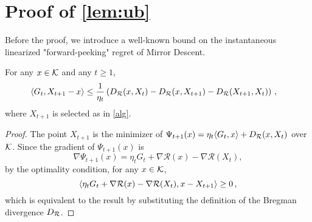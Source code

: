 \fi

\section{Proof of \cref{lem:ub}}
\label{sec:lemub-proof}
\label{sec:ublemma-proof}
Before the proof, we introduce a well-known bound on the instantaneous linearized "forward-peeking" regret of Mirror Descent.
\begin{lemma}
\label{lem:mdlinregret}
For any $x \in \mathcal{K}$ and any $t \ge 1$,
\begin{align*}
\MoveEqLeft
\ip{G_t, X_{t+1}-x}
\le \dfrac{1}{\eta_t} \left( \DR(x,X_t)-\DR(x,X_{t+1})-\DR(X_{t+1},X_t) \right)\,,
\end{align*}
where $X_{t+1}$ is selected as in \cref{alg}.
\end{lemma}
\begin{proof}
The point $X_{t+1}$ is the minimizer of
$\Psi_{t+1}(x)=\eta_t \langle G_t,x \rangle+D_{\mathcal{R}}(x,X_t)$ over $\mathcal{K}$. Since the gradient of $\Psi_{t+1}(x)$ is
\[
\nabla \Psi_{t+1}(x) = \eta_t G_t + \nabla\mathcal{R}(x)-\nabla\mathcal{R}(X_t),
\]
by the optimality condition, for any $x \in \mathcal{K}$,
\[
\langle \eta_t G_t + \nabla\mathcal{R}(x)-\nabla\mathcal{R}(X_t), x-X_{t+1} \rangle\ge 0 \,,
\]
which is equivalent to the result by substituting the definition of the Bregman divergence $D_{\mathcal{R}}$.
\end{proof}

